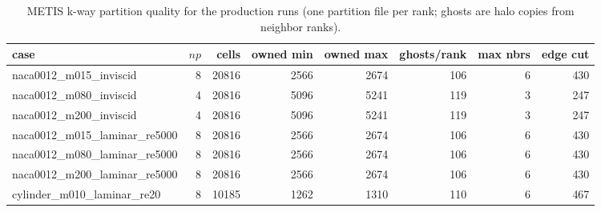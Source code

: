 \begin{table}[ht]\centering\small
\caption{METIS k-way partition quality for the production runs (one partition file per rank; ghosts are halo copies from neighbor ranks).}
\label{tab:partition}
\begin{tabular}{lrrrrrrr}
\toprule
case & $np$ & cells & owned min & owned max & ghosts/rank & max nbrs & edge cut\\
\midrule
naca0012\_m015\_inviscid & 8 & 20816 & 2566 & 2674 & 106 & 6 & 430\\
naca0012\_m080\_inviscid & 4 & 20816 & 5096 & 5241 & 119 & 3 & 247\\
naca0012\_m200\_inviscid & 4 & 20816 & 5096 & 5241 & 119 & 3 & 247\\
naca0012\_m015\_laminar\_re5000 & 8 & 20816 & 2566 & 2674 & 106 & 6 & 430\\
naca0012\_m080\_laminar\_re5000 & 8 & 20816 & 2566 & 2674 & 106 & 6 & 430\\
naca0012\_m200\_laminar\_re5000 & 8 & 20816 & 2566 & 2674 & 106 & 6 & 430\\
cylinder\_m010\_laminar\_re20 & 8 & 10185 & 1262 & 1310 & 110 & 6 & 467\\
\bottomrule
\end{tabular}
\end{table}
